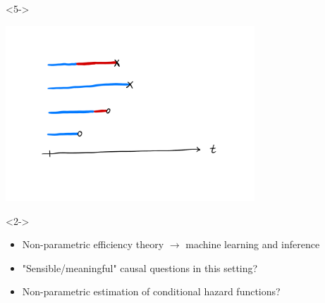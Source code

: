 \documentclass[smaller]{beamer}\usepackage{listings}
\begin{document}
\begin{frame}[label={sec:org2e9e86b}]{}
\begin{onlyenv}<5->
\begin{center}
\includegraphics[page=3,width=0.7\textwidth,trim={1cm 5cm 6cm 3cm},clip]{./Multi-State-illustration.pdf}
\end{center}
\end{onlyenv}


\begin{onlyenv}<2->
\vfill
\begin{itemize}
\item<4-> Non-parametric efficiency theory $\rightarrow$ machine learning and inference
\item<6-> "Sensible/meaningful" causal questions in this setting?
\item<7-> Non-parametric estimation of conditional hazard functions?
\end{itemize}
\end{onlyenv}
\end{frame}
\end{document}

